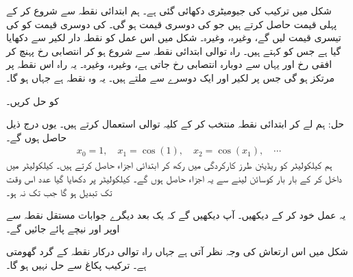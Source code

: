 شکل  میں ترکیب کی جیومیٹری دکھائی گئی ہے۔ ہم ابتدائی نقطہ  سے شروع کر کے پہلی قیمت  حاصل کرتے ہیں جو  کی دوسری قیمت  ہو گی۔  کی دوسری قیمت  کو  کی تیسری قیمت  لیں گے، وغیرہ، وغیرہ۔  شکل  میں اس عمل کو نقطہ دار لکیر سے دکھایا گیا ہے جس کو  کہتے ہیں۔ راہ توالی ابتدائی نقطہ  سے شروع ہو کر انتصابی رخ  پہنچ کر افقی رخ  اور یہاں سے دوبارہ  انتصابی رخ  جاتی ہے، وغیرہ، وغیرہ۔ یہ راہ اس نقطہ پر مرتکز ہو گی جس پر لکیر  اور  ایک دوسرے سے ملتے ہیں۔ یہ وہ نقطہ ہے جہاں  ہو گا۔  

 کو حل کریں۔

حل:\quad
ہم  لے کر ابتدائی نقطہ   منتخب کر کے کلیہ توالی  استعمال کرتے ہیں۔ یوں درج ذیل حاصل ہوں گے۔
\begin{align*}
x_0=1,\quad x_1=\cos (1),\quad x_2=\cos(x_1),\quad \cdots
\end{align*}
ہم کیلکولیٹر کو ریڈیئن طرز کارکردگی میں رکھ کر ابتدائی  اجزاء حاصل کرتے ہیں۔ کیلکولیٹر میں  داخل کر کے بار بار کوسائن لینے سے یہ اجزاء حاصل ہوں گے۔ کیلکولیٹر پر دکھایا گیا عدد اس وقت تک تبدیل ہو گا جب تک  نہ ہو۔

یہ عمل خود کر کے دیکھیں۔ آپ دیکھیں گے کہ یک بعد دیگرے جوابات مستقل نقطہ  سے اوپر اور نیچے پائے جائیں گے۔

شکل  میں اس ارتعاش کی وجہ نظر آتی ہے جہاں راہ توالی درکار نقطہ کے گرد گھومتی ہے۔
ترکیب پکاغ سے  حل نہیں ہو گا۔

